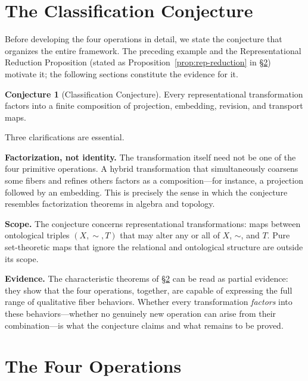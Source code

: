 \documentclass[12pt, a4paper]{article}
\theoremstyle{plain}
\theoremstyle{definition}
\newtheorem{conjecture}[theorem]{Conjecture}
\theoremstyle{remark}
\begin{document}
\section{The Classification Conjecture}
\label{sec:conjecture}

Before developing the four operations in detail, we state the conjecture
that organizes the entire framework. The preceding example and the
Representational Reduction Proposition (stated as Proposition~\ref{prop:rep-reduction}
in \S\ref{sec:operations}) motivate it; the following sections constitute
the evidence for it.

\begin{conjecture}[Classification Conjecture]
\label{conj:classification}
Every representational transformation factors into a finite composition of
projection, embedding, revision, and transport maps.
\end{conjecture}

Three clarifications are essential.

\medskip
\noindent\textbf{Factorization, not identity.}
The transformation itself need not be one of the four primitive operations.
A hybrid transformation that simultaneously coarsens some fibers and refines
others factors as a composition---for instance, a projection followed by an
embedding. This is precisely the sense in which the conjecture resembles
factorization theorems in algebra and topology.

\medskip
\noindent\textbf{Scope.}
The conjecture concerns representational transformations: maps between
ontological triples $(X,\sim,T)$ that may alter any or all of $X$, $\sim$,
and $T$. Pure set-theoretic maps that ignore the relational and ontological
structure are outside its scope.

\medskip
\noindent\textbf{Evidence.}
The characteristic theorems of \S\ref{sec:operations} can be read as
partial evidence: they show that the four operations, together, are capable
of expressing the full range of qualitative fiber behaviors. Whether every
transformation \emph{factors} into these behaviors---whether no genuinely
new operation can arise from their combination---is what the conjecture
claims and what remains to be proved.

\section{The Four Operations}
\label{sec:operations}
\end{document}
